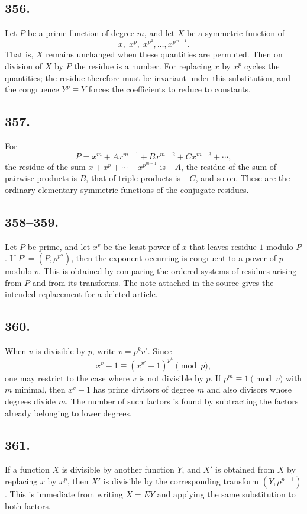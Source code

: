\documentclass[12pt]{article}
\begin{document}
\subsection*{356.}
Let $P$ be a prime function of degree $m$, and let $X$ be a symmetric function of
\[
x,\;x^p,\;x^{p^2},\ldots,x^{p^{m-1}}.
\]
That is, $X$ remains unchanged when these quantities are permuted. Then on division of $X$ by $P$ the residue is a number. For replacing $x$ by $x^p$ cycles the quantities; the residue therefore must be invariant under this substitution, and the congruence $Y^p\equiv Y$ forces the coefficients to reduce to constants.

\subsection*{357.}
For
\[
P=x^m+Ax^{m-1}+Bx^{m-2}+Cx^{m-3}+\cdots,
\]
the residue of the sum $x+x^p+\cdots+x^{p^{m-1}}$ is $-A$, the residue of the sum of pairwise products is $B$, that of triple products is $-C$, and so on. These are the ordinary elementary symmetric functions of the conjugate residues.

\subsection*{358--359.}
Let $P$ be prime, and let $x^v$ be the least power of $x$ that leaves residue $1$ modulo $P$. If $P'=(P,\rho^{p^\alpha})$, then the exponent occurring is congruent to a power of $p$ modulo $v$. This is obtained by comparing the ordered systems of residues arising from $P$ and from its transforms. The note attached in the source gives the intended replacement for a deleted article.

\subsection*{360.}
When $v$ is divisible by $p$, write $v=p^k v'$. Since
\[
x^v-1\equiv (x^{v'}-1)^{p^k}\pmod p,
\]
one may restrict to the case where $v$ is not divisible by $p$. If $p^m\equiv1\pmod v$ with $m$ minimal, then $x^v-1$ has prime divisors of degree $m$ and also divisors whose degrees divide $m$. The number of such factors is found by subtracting the factors already belonging to lower degrees.

\subsection*{361.}
If a function $X$ is divisible by another function $Y$, and $X'$ is obtained from $X$ by replacing $x$ by $x^p$, then $X'$ is divisible by the corresponding transform $(Y,\rho^{p-1})$. This is immediate from writing $X=EY$ and applying the same substitution to both factors.
\end{document}
